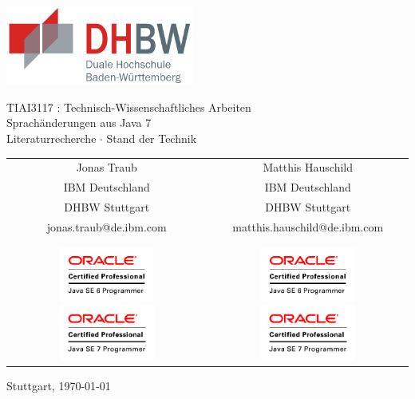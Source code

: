 \begin{titlepage}
    \begin{center}
     \includegraphics[height=2.6cm]{images/dhbw.png}

      \vspace*{12mm}    
      TIAI3117 : Technisch-Wissenschaftliches Arbeiten\\
      \vspace*{30mm}    
      {\Huge{Sprachänderungen aus Java 7}}\\
      \vspace*{5mm}    
      Literaturrecherche $\cdot$ Stand der Technik\\
\vspace*{35mm}

\begin{tabular}{c|c}
Jonas Traub & Matthis Hauschild\\
IBM Deutschland & IBM Deutschland\\
DHBW Stuttgart & DHBW Stuttgart\\
jonas.traub@de.ibm.com & matthis.hauschild@de.ibm.com\\
 & \\
 & \\
\includegraphics[height=1.8cm]{images/OCPJ6P.png} \includegraphics[height=1.8cm]{images/OCPJ7P.png} & \includegraphics[height=1.8cm]{images/OCPJ6P.png} \includegraphics[height=1.8cm]{images/OCPJ7P.png}\\
\end{tabular}

      \vfill
      \vspace*{70mm}
      Stuttgart, \today
    \end{center}
\end{titlepage}

